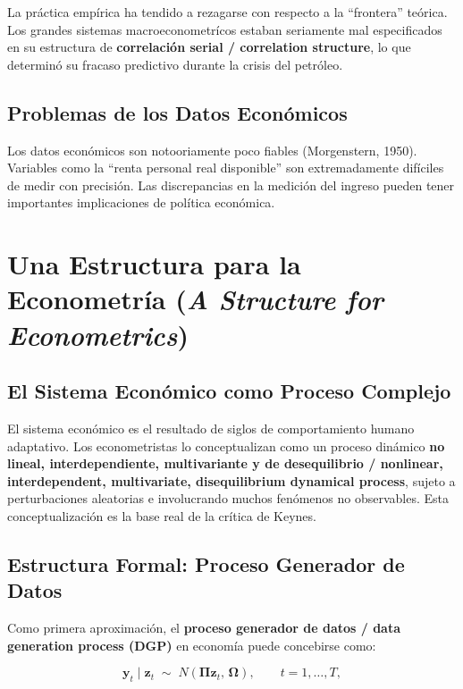 \documentclass[12pt]{article}
\begin{document}
La pr\'actica emp\'irica ha tendido a rezagarse con respecto a la ``frontera'' te\'orica. Los grandes sistemas macroeconometr\'icos estaban seriamente mal especificados en su estructura de \textbf{correlaci\'on serial / correlation structure}, lo que determin\'o su fracaso predictivo durante la crisis del petr\'oleo.

\subsection{Problemas de los Datos Econ\'omicos}

Los datos econ\'omicos son notooriamente poco fiables (Morgenstern, 1950). Variables como la ``renta personal real disponible'' son extremadamente dif\'iciles de medir con precisi\'on. Las discrepancias en la medici\'on del ingreso pueden tener importantes implicaciones de pol\'itica econ\'omica.

\section{Una Estructura para la Econometr\'ia (\textit{A Structure for Econometrics})}

\subsection{El Sistema Econ\'omico como Proceso Complejo}

El sistema econ\'omico es el resultado de siglos de comportamiento humano adaptativo. Los econometristas lo conceptualizan como un proceso din\'amico \textbf{no lineal, interdependiente, multivariante y de desequilibrio / nonlinear, interdependent, multivariate, disequilibrium dynamical process}, sujeto a perturbaciones aleatorias e involucrando muchos fen\'omenos no observables. Esta conceptualizaci\'on es la base real de la cr\'itica de Keynes.

\subsection{Estructura Formal: Proceso Generador de Datos}

Como primera aproximaci\'on, el \textbf{proceso generador de datos / data generation process (DGP)} en econom\'ia puede concebirse como:

\begin{equation}
  \mathbf{y}_t \mid \mathbf{z}_t \;\sim\; N(\mathbf{\Pi z}_t,\, \mathbf{\Omega}), \qquad t = 1, \ldots, T,
\end{equation}
\end{document}
